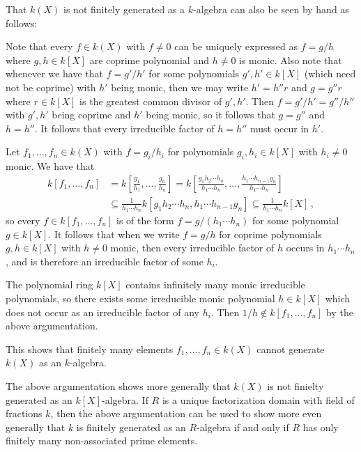 \begin{remark}
  That $k(X)$ is not finitely generated as a $k$-algebra can also be seen by hand as follows:
  
  Note that every $f \in k(X)$ with $f \neq 0$ can be uniquely expressed as $f = g/h$ where $g, h \in k[X]$ are coprime polynomial and $h \neq 0$ is monic.
  Also note that whenever we have that $f = g'/h'$ for some polynomials $g', h' \in k[X]$ (which need not be coprime) with $h'$ being monic, then we may write $h' = h'' r$ and $g = g'' r$ where $r \in k[X]$ is the greatest common divisor of $g', h'$.
  Then $f = g'/h' = g''/h''$ with $g', h'$ being coprime and $h'$ being monic, so it follows that $g = g''$ and $h = h''$.
  It follows that every irreducible factor of $h = h''$ must occur in $h'$.
  
  Let $f_1, \dotsc, f_n \in k(X)$ with $f = g_i/h_i$ for polynomials $g_i, h_i \in k[X]$ with $h_i \neq 0$ monic.
  We have that
  \begin{align*}
              k[f_1, \dotsc, f_n]
    &=        k\left[ \frac{g_1}{h_1}, \dotsc, \frac{g_n}{h_n} \right]
     =        k\left[
                \frac{g_1 h_2 \dotsm h_n}{h_1 \dotsm h_n},
                \dotsc,
                \frac{h_1 \dotsm h_{n-1} g_n}{h_1 \dotsm h_n}
              \right] \\
    &\subseteq  \frac{1}{h_1 \dotsm h_n} k[g_1 h_2 \dotsm h_n, h_1 \dotsm h_{n-1} g_n]
     \subseteq  \frac{1}{h_1 \dotsm h_n} k[X] \,,
  \end{align*}
  so every $f \in k[f_1, \dotsc, f_n]$ is of the form $f = g/(h_1 \dotsm h_n)$ for some polynomial $g \in k[X]$.
  It follows that when we write $f = g/h$ for coprime polynomials $g, h \in k[X]$ with $h \neq 0$ monic, then every irreducible factor of $h$ occurs in $h_1 \dotsm h_n$, and is therefore an irreducible factor of some $h_i$.
  
  The polynomial ring $k[X]$ contains infinitely many monic irreducible polynomials, so there exists some irreducible monic polynomial $h \in k[X]$ which does not occur as an irreducible factor of any $h_i$.
  Then $1/h \notin k[f_1, \dotsc, f_n]$ by the above argumentation.
  
  This shows that finitely many elements $f_1, \dotsc, f_n \in k(X)$ cannot generate $k(X)$ as an $k$-algebra.
\end{remark}


\begin{remark}
  The above argumentation shows more generally that $k(X)$ is not finielty generated as an $k[X]$-algebra.
  If $R$ is a unique factorization domain with field of fractions $k$, then the above argumentation can be used to show more even generally that $k$ is finitely generated as an $R$-algebra if and only if $R$ has only finitely many non-associated prime elements.
\end{remark}
